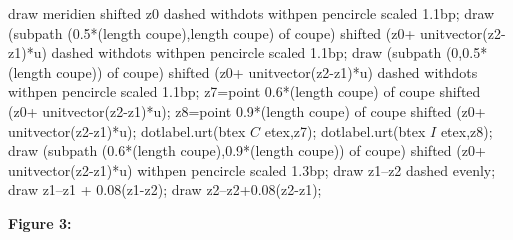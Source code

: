 \begin{changemargin}{-5mm}{-10mm}
\begin{exemple*1}
\begin{minipage}{0.35\linewidth}
\begin{center}
{\begin{Geometrie}
                    draw meridien shifted z0 dashed withdots withpen pencircle scaled 1.1bp;
                    draw (subpath (0.5*(length coupe),length coupe) of coupe) shifted (z0+ unitvector(z2-z1)*u) dashed withdots  withpen pencircle scaled 1.1bp;
                    draw (subpath (0,0.5*(length coupe)) of coupe) shifted (z0+ unitvector(z2-z1)*u) dashed withdots  withpen pencircle scaled 1.1bp;
                    z7=point 0.6*(length coupe) of coupe shifted (z0+ unitvector(z2-z1)*u);
                    z8=point 0.9*(length coupe) of coupe shifted (z0+ unitvector(z2-z1)*u);
                    dotlabel.urt(btex $C$ etex,z7);
                    dotlabel.urt(btex $I$ etex,z8);
                    draw (subpath (0.6*(length coupe),0.9*(length coupe)) of coupe) shifted (z0+ unitvector(z2-z1)*u) withpen pencircle scaled 1.3bp;
                    draw z1--z2 dashed evenly;
                    draw z1--z1 + 0.08(z1-z2);
                    draw z2--z2+0.08(z2-z1);
                \end{Geometrie}
            }

            \textbf{Figure 3:}


\end{center}
\end{minipage}
\end{exemple*1}
\end{changemargin}
